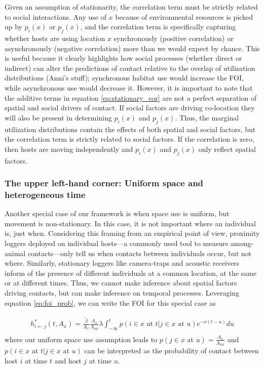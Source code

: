 \documentclass[letterpaper]{article}
\begin{document}
Given an assumption of stationarity, the correlation term must be strictly related to social interactions.  Any use of $x$ because of environmental resources is picked up by $p_i(x)$ or $p_j(x)$, and the correlation term is specifically capturing whether hosts are using location $x$ synchronously (positive correlation) or asynchronously (negative correlation) more than we would expect by chance.  This is useful because it clearly highlights how social processes (whether direct or indirect) can alter the predictions of contact relative to the overlap of utilization distributions (Anni's stuff); synchronous habitat use would increase the FOI, while asynchronous use would decrease it. However, it is important to note that the additive terms in equation \ref{eq:stationary_cor} are not a perfect separation of spatial and social drivers of contact. If social factors are driving co-location they will also be present in determining $p_i(x)$ and $p_j(x)$. Thus, the marginal utilization distributions contain the effects of both spatial and social factors, but the correlation term is strictly related to social factors.  If the correlation is zero, then hosts are moving independently and $p_i(x)$ and $p_j(x)$ only reflect spatial factors.


\subsubsection*{The upper left-hand corner: Uniform space and heterogeneous time}

Another special case of our framework is when space use is uniform, but movement is non-stationary.  In this case, it is not important where an individual is, just when. Considering this framing from an empirical point of view, proximity loggers deployed on individual hosts---a commonly used tool to measure among-animal contacts---only tell us when contacts between individuals occur, but not where.  Similarly, stationary loggers like camera-traps and acoustic receivers inform of the presence of different individuals at a common location, at the same or at different times. %
Thus, we cannot make inference about spatial factors driving contacts, but can make inference on temporal processes. Leveraging equation \ref{eq:foi_prob}, we can write the FOI for this special case as 

\begin{equation}
    \begin{aligned}
    h^*_{i \leftarrow j}(t, A_x) = \frac{\tilde{\beta}}{A_x}\frac{A_x}{A_{tot}} \lambda \int_{-\infty}^{t} p(i \in x \text{ at } t | j \in x \text{ at } u) e^{-\nu(t - u)} du \\
    \end{aligned}
    \label{eq:foi_uniform_space}
\end{equation}
where our uniform space use assumption leads to $p(j \in x \text{ at } u) = \frac{A_x}{A_{tot}}$ and $p(i \in x \text{ at } t | j \in x \text{ at } u)$ can be interpreted as the probability of contact between host $i$ at time $t$ and host $j$ at time $u$.  
\end{document}
